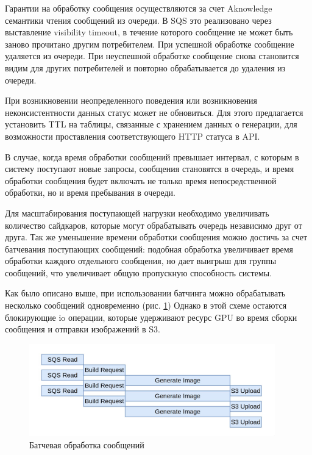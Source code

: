 Гарантии на обработку сообщения осуществляются за счет Aknowledge семантики чтения сообщений из очереди. 
В SQS это реализовано через выставление visibility timeout, в течение которого сообщение не может быть заново прочитано другим
потребителем. При успешной обработке сообщение удаляется из очереди. При неуспешной обработке сообщение снова становится 
видим для других потребителей и повторно обрабатывается до удаления из очереди.

При возникновении неопределенного поведения или возникновения неконсистентности данных статус может не обновиться.
Для этого предлагается установить TTL на таблицы, связанные с хранением данных о генерации, для 
возможности проставления соответствующего HTTP статуса в API.

В случае, когда время обработки сообщений превышает интервал, с которым в систему
поступают новые запросы, сообщения становятся в очередь, и время обработки сообщения будет 
включать не только время непосредственной обработки, но и время пребывания в очереди.

Для масштабирования поступающей нагрузки необходимо увеличивать количество сайдкаров, которые могут 
обрабатывать очередь независимо друг от друга. Так же уменьшение времени обработки сообщения можно 
достичь за счет батчевания поступающих сообщений: подобная обработка увеличивает время обработки 
каждого отдельного сообщения, но дает выигрыш для группы сообщений, что увеличивает общую
пропускную способность системы.

Как было описано выше, при использовании батчинга можно обрабатывать несколько сообщений одновременно (рис. \ref{fig:flame1})
Однако в этой схеме остаются блокирующие io операции, которые удерживают ресурс GPU во время сборки сообщения и отправки изображений
в S3. 

\begin{footnotesize}

\begin{figure}[H]
  \centering
  \includegraphics[width=0.95\textwidth]{img/flame1.jpg}
  \caption{Батчевая обработка сообщений}
    \label{fig:flame1}
\end{figure}
\end{footnotesize}

